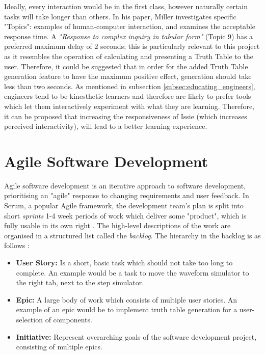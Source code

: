 Ideally, every interaction would be in the first class, however naturally certain tasks will take longer than others. In his paper, Miller investigates specific "Topics": examples of human-computer interaction, and examines the acceptable response time. A \textit{"Response to complex inquiry in tabular form"} (Topic 9) has a preferred maximum delay of 2 seconds; this is particularly relevant to this project as it resembles the operation of calculating and presenting a Truth Table to the user. Therefore, it could be suggested that in order for the added Truth Table generation feature to have the maximum positive effect, generation should take less than two seconds.
As mentioned in subsection \ref{subsec:educating_engineers}, engineers tend to be kinesthetic learners and therefore are likely to prefer tools which let them interactively experiment with what they are learning. Therefore, it can be proposed that increasing the responsiveness of Issie (which increases perceived interactivity), will lead to a better learning experience.


\section{Agile Software Development}
Agile software development \cite{alma9955899676101591} is an iterative approach to software development, prioritising an "agile" response to changing requirements and user feedback. In Scrum, a popular Agile framework, the development team's plan is split into short \textit{sprints} 1-4 week periods of work which deliver some "product", which is fully usable in its own right \cite{mepCW}. The high-level descriptions of the work are organised in a structured list called the \textit{backlog}. The hierarchy in the backlog is as follows \cite{backlog}:
\begin{itemize}
    \item \textbf{User Story:} Is a short, basic task which should not take too long to complete. An example would be a task to move the waveform simulator to the right tab, next to the step simulator.
    \item \textbf{Epic:} A large body of work which consists of multiple user stories. An example of an epic would be to implement truth table generation for a user-selection of components.
    \item \textbf{Initiative:} Represent overarching goals of the software development project, consisting of multiple epics.
\end{itemize}

